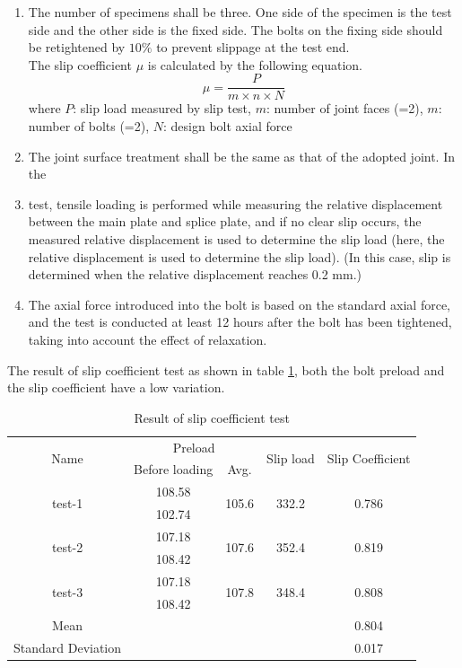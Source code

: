 \begin{enumerate}
    \item The number of specimens shall be three. One side of the specimen is the test side and the other side is the fixed side. The bolts on the fixing side should be retightened by $10\%$ to prevent slippage at the test end. \\
    The slip coefficient $\mu$ is calculated by the following equation.
    \begin{equation}
    \mu = \frac{P}{m\times n \times N}
    \end{equation}
    where $P$: slip load measured by slip test, $m$: number of joint faces (=2), $m$: number of bolts (=2), $N$: design bolt axial force
    
    \item The joint surface treatment shall be the same as that of the adopted joint.
    In the 
    \item test, tensile loading is performed while measuring the relative displacement between the main plate and splice plate, and if no clear slip occurs, the measured relative displacement is used to determine the slip load (here, the relative displacement is used to determine the slip load). (In this case, slip is determined when the relative displacement reaches 0.2 mm.)
    \item The axial force introduced into the bolt is based on the standard axial force, and the test is conducted at least 12 hours after the bolt has been tightened, taking into account the effect of relaxation.
\end{enumerate}

The result of slip coefficient test as shown in table \ref{tab-slipcoef}, both the bolt preload and the slip coefficient have a low variation.

\begin{table}[htbp]
\centering
\caption{Result of slip coefficient test}\label{tab-slipcoef}
\begin{tabular}{@{}ccccc@{}}
\toprule
\multirow{2}{*}{Name} & \multicolumn{2}{c}{Preload} & \multirow{2}{*}{Slip load} & \multirow{2}{*}{Slip Coefficient} \\ \cmidrule(lr){2-3}
 & Before loading & Avg. &  &  \\ \midrule
\multirow{2}{*}{test-1} & 108.58 & \multirow{2}{*}{105.6} & \multirow{2}{*}{332.2} & \multirow{2}{*}{0.786} \\
 & 102.74 &  &  &  \\
\multirow{2}{*}{test-2} & 107.18 & \multirow{2}{*}{107.6} & \multirow{2}{*}{352.4} & \multirow{2}{*}{0.819} \\
 & 108.42 &  &  &  \\
\multirow{2}{*}{test-3} & 107.18 & \multirow{2}{*}{107.8} & \multirow{2}{*}{348.4} & \multirow{2}{*}{0.808} \\
 & 108.42 &  &  &  \\
Mean &  &  &  & 0.804 \\
Standard Deviation &  &  &  & 0.017 \\ \bottomrule
\end{tabular}
\end{table}


